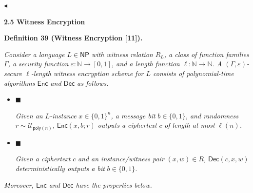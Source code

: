 \documentclass[10pt,a4paper]{article}
\begin{document}
$\blacktriangleleft$\par






\par\medskip\noindent\textbf{
2.5 Witness Encryption}\par





\par\medskip\noindent\textbf{
\textbf{Definition 39}\textbf{ }(Witness Encryption [11])\textbf{.}
}\par



\emph{Consider a language $L\in{\mathsf{NP}}$ with witness relation $R_{L}$, a class of function families $\Gamma$, a security function $\varepsilon:\mathbb{N}\to[0,1]$, and a length function $\ell:\mathbb{N}\to\mathbb{N}$. A $(\Gamma,\varepsilon)$-secure $\ell$-length witness encryption scheme for $L$ consists of polynomial-time algorithms ${\mathsf{Enc}}$ and ${\mathsf{Dec}}$ as follows.}\par


\begin{itemize}


\item[] 
$\blacksquare$ 


\emph{Given an }$L$\emph{-instance }$x\in\{0,1\}^{n}$\emph{, a message bit }$b\in\{0,1\}$\emph{, and randomness }$r\sim\mathcal{U}_{{\mathsf{poly}}(n)}$\emph{, }${\mathsf{Enc}}(x,b;r)$\emph{ outputs a ciphertext }$c$\emph{ of length at most }$\ell(n)$\emph{.}\par





\item[] 
$\blacksquare$ 


\emph{Given a ciphertext }$c$\emph{ and an instance/witness pair }$(x,w)\in R$\emph{, }${\mathsf{Dec}}(c,x,w)$\emph{ deterministically outputs a bit }$b\in\{0,1\}$\emph{.}\par





\end{itemize}


\emph{Moreover, ${\mathsf{Enc}}$ and ${\mathsf{Dec}}$ have the properties below.}\par
\end{document}

